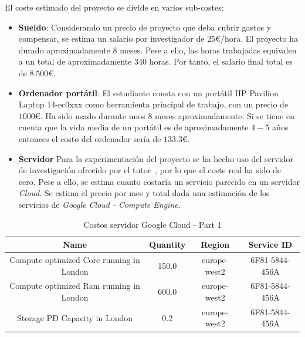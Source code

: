 El coste estimado del proyecto se divide en varios sub-costes:
\begin{itemize}
      \item \textbf{Sueldo}: Considerando un precio de proyecto que deba cubrir gastos y compensar, se estima un salario por investigador de $25$€/hora. El proyecto ha durado aproximadamente $8$ meses. Pese a ello, las horas trabajadas equivalen a un total de aproximadamente $340$ horas. Por tanto, el salario final total es de $8.500$€.
      \item \textbf{Ordenador portátil}: El estudiante consta con un portátil HP Pavilion Laptop 14-ec0xxx como herramienta principal de trabajo, con un precio de $1000$€. Ha sido usado durante unos $8$ meses aproximadamente. Si se tiene en cuenta que la vida media de un portátil es de aproximadamente $4-5$ años~\cite{woidasky_use_2021} entonces el costo del ordenador sería de $133.3$€.
      \item \textbf{Servidor} Para la experimentación del proyecto se ha hecho uso del servidor de investigación ofrecido por el tutor~\cite{citicugr}, por lo que el coste real ha sido de cero. Pese a ello, se estima cuanto costaría un servicio parecido en un servidor \textit{Cloud}. Se estima el precio por mes y total dada una estimación de los servicios de \textit{Google Cloud - Compute Engine}.
\end{itemize}
\begin{table}[htp]
      \centering
      \begin{adjustbox}{width=\linewidth}
            \begin{tabular}{|c|c|c|c|}
                  \hline
                  \textbf{Name}                            & \textbf{Quantity} & \textbf{Region} & \textbf{Service ID} \\
                  \hline
                  Compute optimized Core running in London & 150.0             & europe-west2    & 6F81-5844-456A      \\
                  Compute optimized Ram running in London  & 600.0             & europe-west2    & 6F81-5844-456A      \\
                  Storage PD Capacity in London            & 0.2               & europe-west2    & 6F81-5844-456A      \\
                  \hline
            \end{tabular}
      \end{adjustbox}
      \caption{Costos servidor Google Cloud - Part 1}
      \label{tab:server_costs_part1}
\end{table}
